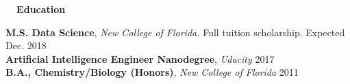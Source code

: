 \documentclass[a4paper,12pt]{article}
\newcommand{\resheading}[1]{{\vspace*{.001in} \colorbox{mygrey}{\begin{minipage}{\textwidth}{\textmd{\large \textbf{#1} \vphantom{p\^{E}}}}\end{minipage}}} }
\newcommand{\ressubheading}[4]{
        \textbf{#1} \hfill #2\\
        \textit{#3} \hfill #4 \\}
\begin{document}




\resheading{~~Education}

\textbf{M.S. Data Science}, \textit{New College of Florida.} Full tuition scholarship. \hfill Expected Dec. 2018\\
\textbf{Artificial Intelligence Engineer Nanodegree}, \textit{Udacity} \hfill 2017\\
\textbf{B.A., Chemistry/Biology (Honors)}, \textit{New College of Florida} \hfill 2011

\end{document}
